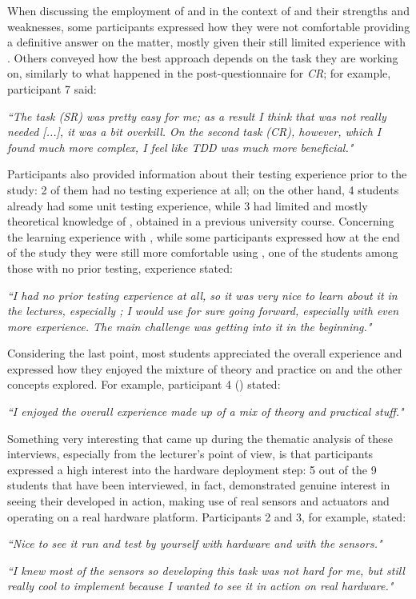 When discussing the employment of \tdd and \notdd in the context of \ess and their strengths and weaknesses, some participants expressed how they were not comfortable providing a definitive answer on the matter, mostly given their still limited experience with \tdd. Others conveyed how the best approach depends on the task they are working on, similarly to what happened in the post-questionnaire for \textit{CR}; for example, participant 7 said:
\begin{mdframed}
    \textit{``The task (SR) was pretty easy for me; as a result I think that \tdd was not really needed [...], it was a bit overkill. On the second task (CR), however, which I found much more complex, I feel like TDD was much more beneficial."}
\end{mdframed}

Participants also provided information about their testing experience prior to the study: 2 of them had no testing experience at all; on the other hand, 4 students already had some unit testing experience, while 3 had limited and mostly theoretical knowledge of \tdd, obtained in a previous university course.
Concerning the learning experience with \tdd, while some participants expressed how at the end of the study they were still more comfortable using \notdd, one of the students among those with no prior testing, experience stated:
\begin{mdframed}
\textit{``I had no prior testing experience at all, so it was very nice to learn about it in the lectures, especially \tdd; I would use \tdd for sure going forward, especially with even more experience. The main challenge was getting into it in the beginning."}
\end{mdframed}

Considering the last point, most students appreciated the overall experience and expressed how they enjoyed the mixture of theory and practice on \tdd and the other concepts explored. For example, participant 4 (\tdd) stated:
\begin{mdframed}
    \textit{``I enjoyed the overall experience made up of a mix of theory and practical stuff."}
\end{mdframed}

Something very interesting that came up during the thematic analysis of these interviews, especially from the lecturer's point of view, is that participants expressed a high interest into the hardware deployment step: 5 out of the 9 students that have been interviewed, in fact, demonstrated genuine interest in seeing their developed \es in action, making use of real sensors and actuators and operating on a real hardware platform. 
Participants 2 and 3, for example, stated:
\begin{mdframed}
    \textit{``Nice to see it run and test by yourself with hardware and with the sensors."}
\end{mdframed}
\begin{mdframed}
    \textit{``I knew most of the sensors so developing this task was not hard for me, but still really cool to implement because I wanted to see it in action on real hardware."}
\end{mdframed}

